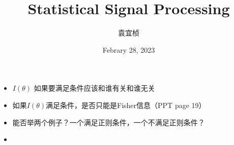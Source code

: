 \documentclass{article}
\title{Statistical Signal Processing}
\author{袁宜桢}
\date{Febrary 28, 2023}
\begin{document}
\maketitle
\begin{itemize}
    \item $I(\theta)$ 如果要满足条件应该和谁有关和谁无关
    \item 如果$I(\theta)$满足条件，是否只能是Fisher信息（PPT page 19）
    \item 能否举两个例子？一个满足正则条件，一个不满足正则条件？
    \item 
\end{itemize}
\end{document}
